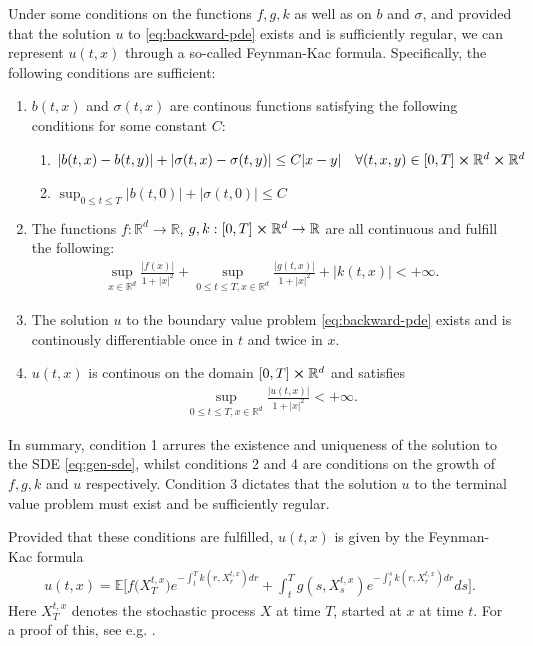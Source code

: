 Under some conditions on the functions $f, g, k$ as well as on $b$ and $\sigma$, and provided that the solution $u$ to \autoref{eq:backward-pde} exists and is sufficiently regular, we can represent $u(t,x)$ through a so-called Feynman-Kac formula. Specifically, the following conditions are sufficient:

\begin{enumerate}
    \item $b(t,x)$ and $\sigma(t,x)$ are continous functions satisfying the following conditions for some constant $C$: \begin{enumerate}
        \item $\lvert b(t,x) - b(t,y) \rvert + \lvert \sigma(t,x) - \sigma(t,y) \rvert \leq C \lvert x - y \rvert \quad \forall (t,x,y) \in [0,T]\cross \mathbb{R}^d \cross \mathbb{R}^d$
        \item $ \sup_{0\leq t \leq T} \lvert b(t,0) \rvert + \lvert \sigma(t,0) \rvert \leq C$
    \end{enumerate}
    \item The functions $f:\mathbb{R}^d \rightarrow \mathbb{R}$, $g,k : [0,T]\cross \mathbb{R}^d \rightarrow \mathbb{R}$ are all continuous and fulfill the following:
    \begin{align} 
        \sup_{x \in \mathbb{R}^d} \frac{\lvert f(x) \rvert}{1 + {\lvert x \rvert} ^2} + \sup_{0 \leq t \leq T, x \in \mathbb{R}^d} \frac{\lvert g(t,x) \rvert}{1 + {\lvert x \rvert}^2} + \lvert k(t,x) \rvert < + \infty.
    \end{align}
    \item The solution $u$ to the boundary value problem \autoref{eq:backward-pde} exists and is continously differentiable once in $t$ and twice in $x$.
    \item $u(t,x)$ is continous on the domain $[0,T]\cross\mathbb{R}^d$ and satisfies 
    \begin{align} 
        \sup_{0\leq t \leq T, x \in \mathbb{R}^d} \frac{\lvert u(t,x) \rvert}{1 + {\lvert x \rvert}^2} < + \infty.
    \end{align}
\end{enumerate}
In summary, condition 1 arrures the existence and uniqueness of the solution to the SDE \autoref{eq:gen-sde}, whilst conditions 2 and 4 are conditions on the growth of $f,g,k$ and $u$ respectively. Condition 3 dictates that the solution $u$ to the terminal value problem must exist and be sufficiently regular.

Provided that these conditions are fulfilled, $u(t,x)$ is given by the Feynman-Kac formula
%
\begin{align}
    \label{eq:linear-fc} 
    u(t,x) = \mathbb{E}\bigg[ f\big( X_T^{t,x} \big) e^{-\int_t^T k(r,X_r^{t,x})dr} + \int_t^T g(s,X_s^{t,x}) e^{-\int_t^s k(r,X_r^{t,x})dr}ds\bigg].
\end{align} 
%
Here $X_T^{t,x}$ denotes the stochastic process $X$ at time $T$, started at $x$ at time $t$. For a proof of this, see e.g. \cite{gobet2016monte}.

